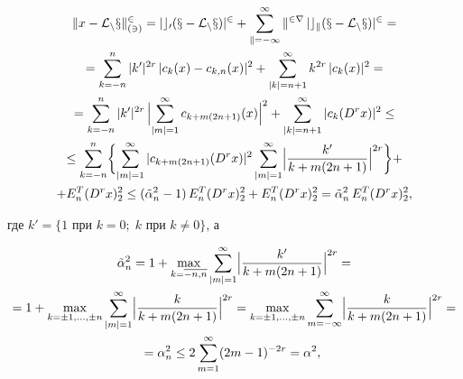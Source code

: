 \begin{pf}
\begin{gather}
\|x-\cal{L}_nx\|_{(3)}^2=|c_0(x-\cal{L}_nx)|^2 +


\sum_{k=-\infty }^\infty k^{2r}\, |c_k(x-\cal{L}_nx)|^2=\notag\\


%


= \sum_{k=-n}^n |k'|^{2r}\, |c_k(x)-c_{k,n}(x)|^2 +


\sum_{|k|=n+1}^\infty {k}^{2r}\, | c_k(x)|^2 =\notag\\


%


= \sum_{k=-n}^n |k'|^{2r}\, \Bigl| \sum_{|m|=1}^\infty


c_{k+m(2n+1)}(x)\Bigr|^2 + \sum_{|k|=n+1}^\infty | c_k(D^rx)|^2 \le\notag\\


%


\le \sum_{k=-n}^n \biggl\{ \sum_{|m|=1}^\infty |c_{k+m(2n+1)}(D^rx)|^2


\sum_{|m|=1}^\infty \Bigl| \frac{k'}{k+m(2n+1)}\Bigr|^{2r} \biggr\} +


\notag\\


%


+ E_n^T(D^rx)_2^2 \le (\Tilde{\alpha}_n^2 -1)\, E_n^T(D^rx)_2^2 +


E_n^T(D^rx)_2^2=


\Tilde{\alpha}_n^2\, E_n^T(D^rx)_2^2,


\end{gather}


где $ k'=\{1\text{ при } k=0;\; k\text{ при } k\ne 0 \}$, а


\begin{gather}


\Tilde{\alpha}_n^2=1+\max_{k=\overline{-n,n}}\sum_{|m|=1}^\infty


\Bigl| \frac{k'}{k+m(2n+1)}\Bigr|^{2r}= \notag\\


%


=1 + \max_{k=\pm 1, \dotsc ,\pm n} \sum_{|m|=1}^\infty


\Bigl| \frac{k}{k+m(2n+1)}\Bigr|^{2r}=


 \max_{k=\pm 1, \dotsc ,\pm n} \sum_{m=-\infty }^\infty


\Bigl| \frac{k}{k+m(2n+1)}\Bigr|^{2r} =\notag\\


%


= \alpha_n^2 \le


2\sum_{m=1}^\infty (2m-1)^{-2r}=\alpha^2,\;



\end{gather}
\end{pf}
